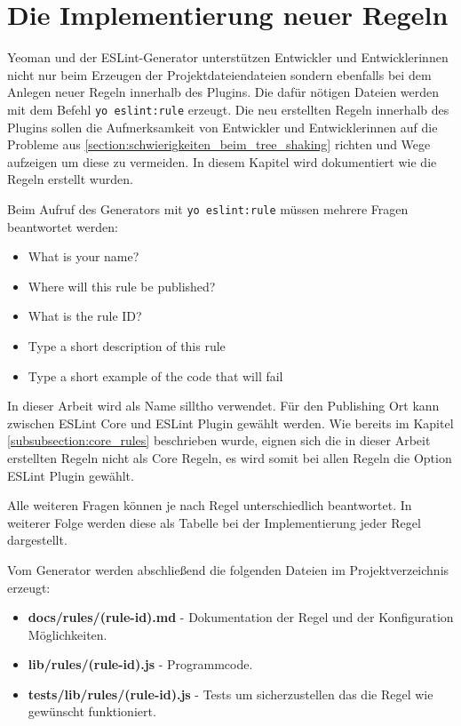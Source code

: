 \section{Die Implementierung neuer Regeln}
Yeoman und der ESLint-Generator unterstützen Entwickler und Entwicklerinnen nicht nur beim Erzeugen der Projektdateiendateien sondern ebenfalls bei dem Anlegen neuer Regeln innerhalb des Plugins. Die dafür nötigen Dateien werden mit dem Befehl \lstinline{yo eslint:rule} erzeugt. Die neu erstellten Regeln innerhalb des Plugins sollen die Aufmerksamkeit von Entwickler und Entwicklerinnen auf die Probleme aus \ref{section:schwierigkeiten_beim_tree_shaking} richten und Wege aufzeigen um diese zu vermeiden. In diesem Kapitel wird dokumentiert wie die Regeln erstellt wurden. 

Beim Aufruf des Generators mit \lstinline{yo eslint:rule} müssen mehrere Fragen beantwortet werden:

\begin{itemize}
	\item What is your name?
    \item Where will this rule be published?
    \item What is the rule ID?
    \item Type a short description of this rule
    \item Type a short example of the code that will fail
\end{itemize}

In dieser Arbeit wird als Name silltho verwendet. Für den Publishing Ort kann zwischen ESLint Core und ESLint Plugin gewählt werden. Wie bereits im Kapitel \ref{subsubsection:core_rules} beschrieben wurde, eignen sich die in dieser Arbeit erstellten Regeln nicht als Core Regeln, es wird somit bei allen Regeln die Option ESLint Plugin gewählt. 

Alle weiteren Fragen können je nach Regel unterschiedlich beantwortet. In weiterer Folge werden diese als Tabelle bei der Implementierung jeder Regel dargestellt.

Vom Generator werden abschließend die folgenden Dateien im Projektverzeichnis erzeugt:
\begin{itemize}
	\item \textbf{docs/rules/(rule-id).md} - Dokumentation der Regel und der Konfiguration Möglichkeiten.
    \item \textbf{lib/rules/(rule-id).js} - Programmcode.
    \item \textbf{tests/lib/rules/(rule-id).js} - Tests um sicherzustellen das die Regel wie gewünscht funktioniert.
\end{itemize}

